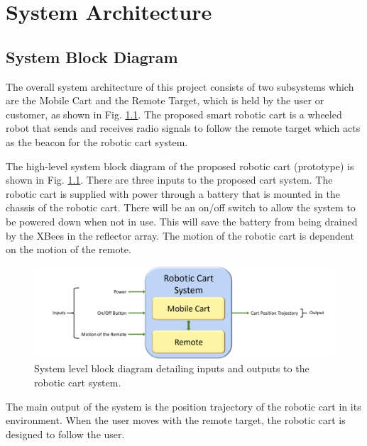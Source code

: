 \chapter{System Architecture}
\label{ch: Chapter2}

\section{System Block Diagram}
The overall system architecture of this project consists of two subsystems which
are the Mobile Cart and the Remote Target, which is held by the user or
customer, as shown in Fig. \ref{fig:sys_block_diag}. The proposed smart robotic
cart is a wheeled robot that sends and receives radio signals to follow the
remote target which acts as the beacon for the robotic cart system.

\vspace*{12pt}
\noindent
The high-level system block diagram of the proposed robotic cart (prototype) is shown in Fig. \ref{fig:sys_block_diag}. There are three inputs to the proposed cart system. The robotic cart is supplied with power through a battery that is mounted in the chassis of the robotic cart. There will be an on/off switch to allow the system to be powered down when not in use. This will save the battery from being drained by the XBees in the reflector array. The motion of the robotic cart is dependent on the motion of the remote.

\begin{figure}[H]
  \centering
  \includegraphics[width=\textwidth]{figs/img/systemBlockDiagram.png}
  \caption{System level block diagram detailing inputs and outputs to the
    robotic cart system.}
	\label{fig:sys_block_diag}
\end{figure}

\vspace*{12pt}
\noindent
The main output of the system is the position trajectory of the robotic cart in its environment. When the user moves with the remote target, the robotic cart is designed to follow the user.



